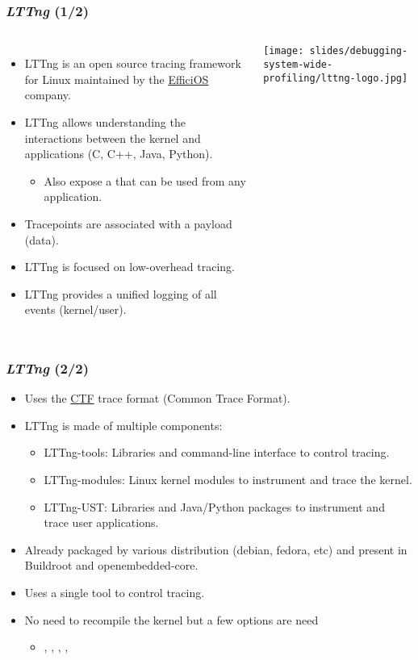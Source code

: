 \begin{frame}
  \frametitle{{\em LTTng} (1/2)}
  \begin{columns}[T]
    \begin{itemize}
      \item LTTng is an open source tracing framework for Linux maintained by
            the \href{https://www.efficios.com/}{EfficiOS} company.
      \item LTTng allows understanding the interactions between the kernel and
            applications (C, C++, Java, Python).
      \begin{itemize}
        \item Also expose a  that can be used from any
              application.
      \end{itemize}
      \item Tracepoints are associated with a payload (data).
      \item LTTng is focused on low-overhead tracing.
      \item LTTng provides a unified logging of all events (kernel/user).
    \end{itemize}
    \texttt{[image: slides/debugging-system-wide-profiling/lttng-logo.jpg]}
  \end{columns}
\end{frame}

\begin{frame}
  \frametitle{{\em LTTng} (2/2)}
  \begin{itemize}
    \item Uses the \href{https://diamon.org/ctf/}{CTF} trace format (Common
          Trace Format).
    \item LTTng is made of multiple components:
    \begin{itemize}
      \item LTTng-tools: Libraries and command-line interface to control tracing.
      \item LTTng-modules: Linux kernel modules to instrument and trace the kernel.
      \item LTTng-UST: Libraries and Java/Python packages to instrument and trace user applications.
    \end{itemize}
    \item Already packaged by various distribution (debian, fedora, etc) and
          present in Buildroot and openembedded-core.
    \item Uses a single tool  to control tracing.
    \item No need to recompile the kernel but a few options are need
    \begin{itemize}
      \item {}, , ,
            , 
    \end{itemize}
  \end{itemize}
\end{frame}


